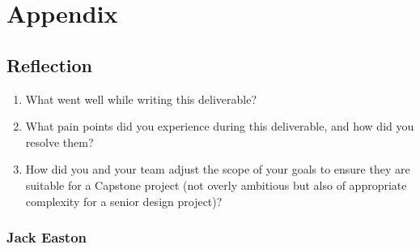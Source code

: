 \documentclass{article}
\begin{document}
\newpage{}

\section*{Appendix}

\subsection*{Reflection}

\begin{enumerate}
    \item What went well while writing this deliverable? 

    \item What pain points did you experience during this deliverable, and how did you resolve them?

    \item How did you and your team adjust the scope of your goals to ensure
    they are suitable for a Capstone project (not overly ambitious but also of 
    appropriate complexity for a senior design project)?
\end{enumerate} 

\subsubsection*{Jack Easton}
\end{document}
